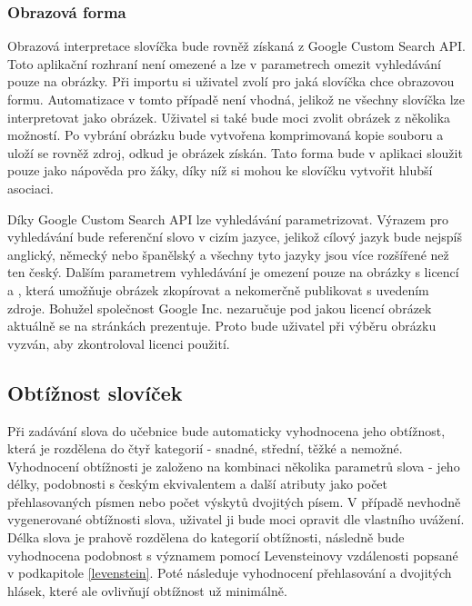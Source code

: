 \documentclass[a4paper,11pt,titlepage,fleqn]{article}
\begin{document}
        \subsubsection{Obrazová forma}
            Obrazová interpretace slovíčka bude rovněž získaná z Google Custom Search API. Toto aplikační rozhraní není omezené a lze v parametrech omezit vyhledávání pouze na obrázky. Při importu si uživatel zvolí pro jaká slovíčka chce obrazovou formu. Automatizace v tomto případě není vhodná, jelikož ne všechny slovíčka lze interpretovat jako obrázek. Uživatel si také bude moci zvolit obrázek z několika možností. Po vybrání obrázku bude vytvořena komprimovaná kopie souboru a uloží se rovněž zdroj, odkud je obrázek získán. Tato forma bude v aplikaci sloužit pouze jako nápověda pro žáky, díky níž si mohou ke slovíčku vytvořit hlubší asociaci. 

            Díky Google Custom Search API lze vyhledávání parametrizovat. Výrazem pro vyhledávání bude referenční slovo v cizím jazyce, jelikož cílový jazyk bude nejspíš anglický, německý nebo španělský a všechny tyto jazyky jsou více rozšířené než ten český. Dalším parametrem vyhledávání je omezení pouze na obrázky s licencí a , která umožňuje obrázek zkopírovat a nekomerčně publikovat s uvedením zdroje. Bohužel společnost Google Inc. nezaručuje pod jakou licencí obrázek aktuálně se na stránkách prezentuje. Proto bude uživatel při výběru obrázku vyzván, aby zkontroloval licenci použití.

    \subsection{Obtížnost slovíček}
        Při zadávání slova do učebnice bude automaticky vyhodnocena jeho obtížnost, která je rozdělena do čtyř kategorií - snadné, střední, těžké a nemožné. Vyhodnocení obtížnosti je založeno na kombinaci několika parametrů slova - jeho délky, podobnosti s českým ekvivalentem a další atributy jako počet přehlasovaných písmen nebo počet výskytů dvojitých písem. V případě nevhodně vygenerované obtížnosti slova, uživatel ji bude moci opravit dle vlastního uvážení. Délka slova je prahově rozdělena do kategorií obtížnosti, následně bude vyhodnocena podobnost s významem pomocí Levensteinovy vzdálenosti popsané v podkapitole \ref{levenstein}. Poté následuje vyhodnocení přehlasování a dvojitých hlásek, které ale ovlivňují obtížnost už minimálně.
\end{document}
